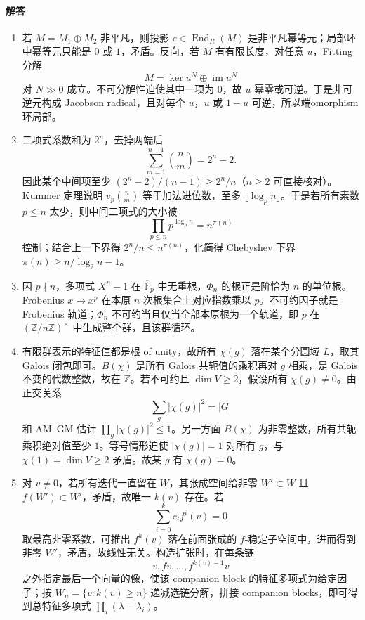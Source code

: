 \documentclass[UTF8,12pt]{ctexart}
\begin{document}
\paragraph{解答}
\begin{enumerate}[label=\textbf{\arabic*.},leftmargin=2.2em]
\item 若 \(M=M_1\oplus M_2\) 非平凡，则投影 \(e\in\operatorname{End}_R(M)\) 是非平凡幂等元；局部环中幂等元只能是 \(0\) 或 \(1\)，矛盾。反向，若 \(M\) 有有限长度，对任意 \(u\)，Fitting 分解
\[
M=\ker u^N\oplus \operatorname{im}u^N
\]
对 \(N\gg0\) 成立。不可分解性迫使其中一项为 \(0\)，故 \(u\) 幂零或可逆。于是非可逆元构成 Jacobson radical，且对每个 \(u\)，\(u\) 或 \(1-u\) 可逆，所以端omorphism环局部。
\item 二项式系数和为 \(2^n\)，去掉两端后
\[
\sum_{m=1}^{n-1}\binom nm=2^n-2.
\]
因此某个中间项至少 \((2^n-2)/(n-1)\ge 2^n/n\)（\(n\ge2\) 可直接核对）。Kummer 定理说明 \(v_p\binom nm\) 等于加法进位数，至多 \(\lfloor\log_p n\rfloor\)。于是若所有素数 \(p\le n\) 太少，则中间二项式的大小被
\[
\prod_{p\le n}p^{\log_p n}=n^{\pi(n)}
\]
控制；结合上一下界得 \(2^n/n\le n^{\pi(n)}\)，化简得 Chebyshev 下界
\(\pi(n)\ge n/\log_2 n-1\)。
\item 因 \(p\nmid n\)，多项式 \(X^n-1\) 在 \(\overline{\mathbb F}_p\) 中无重根，\(\Phi_n\) 的根正是阶恰为 \(n\) 的单位根。Frobenius \(x\mapsto x^p\) 在本原 \(n\) 次根集合上对应指数乘以 \(p\)。不可约因子就是 Frobenius 轨道；\(\Phi_n\) 不可约当且仅当全部本原根为一个轨道，即 \(p\) 在 \((\mathbb Z/n\mathbb Z)^\times\) 中生成整个群，且该群循环。
\item 有限群表示的特征值都是根 of unity，故所有 \(\chi(g)\) 落在某个分圆域 \(L\)，取其 Galois 闭包即可。\(B(\chi)\) 是所有 Galois 共轭值的乘积再对 \(g\) 相乘，是 Galois 不变的代数整数，故在 \(\mathbb Z\)。若不可约且 \(\dim V\ge2\)，假设所有 \(\chi(g)\ne0\)。由正交关系
\[
\sum_g|\chi(g)|^2=|G|
\]
和 AM--GM 估计 \(\prod_g|\chi(g)|^2\le1\)。另一方面 \(B(\chi)\) 为非零整数，所有共轭乘积绝对值至少 \(1\)。等号情形迫使 \(|\chi(g)|=1\) 对所有 \(g\)，与 \(\chi(1)=\dim V\ge2\) 矛盾。故某 \(g\) 有 \(\chi(g)=0\)。
\item 对 \(v\ne0\)，若所有迭代一直留在 \(W\)，其张成空间给非零 \(W'\subset W\) 且 \(f(W')\subset W'\)，矛盾，故唯一 \(k(v)\) 存在。若
\[
\sum_{i=0}^{k}c_if^i(v)=0
\]
取最高非零系数，可推出 \(f^k(v)\) 落在前面张成的 \(f\)-稳定子空间中，进而得到非零 \(W'\)，矛盾，故线性无关。构造扩张时，在每条链
\[
v,fv,\ldots,f^{k(v)-1}v
\]
之外指定最后一个向量的像，使该 companion block 的特征多项式为给定因子；按 \(W_n=\{v:k(v)\ge n\}\) 递减选链分解，拼接 companion blocks，即可得到总特征多项式 \(\prod_i(\lambda-\lambda_i)\)。
\end{enumerate}
\end{document}

